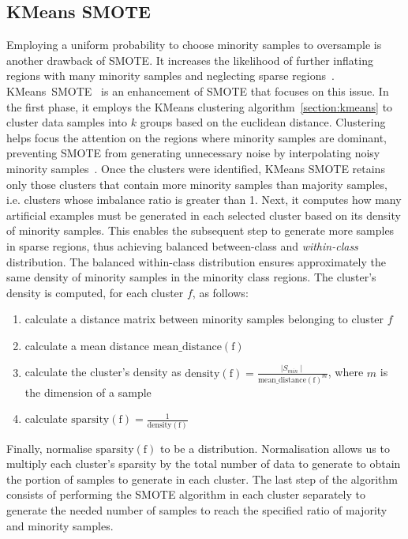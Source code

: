 \subsection{KMeans SMOTE}
\label{subsection:kmeans-smote}

Employing a uniform probability to choose minority samples to oversample is another drawback of
SMOTE. It increases the likelihood of further inflating regions with many minority samples and
neglecting sparse regions~\cite{kmeans-smote}. KMeans~SMOTE~\cite{kmeans-smote} is an enhancement
of SMOTE that focuses on this issue. In the first phase, it employs the KMeans clustering
algorithm~\ref{section:kmeans} to cluster data samples into $k$ groups based on the euclidean
distance. Clustering helps focus the attention on the regions where minority samples are dominant,
preventing SMOTE from generating unnecessary noise by interpolating noisy minority
samples~\cite{kmeans-smote}. Once the clusters were identified, KMeans SMOTE retains only those
clusters that contain more minority samples than majority samples, i.e. clusters whose imbalance
ratio is greater than 1. Next, it computes how many artificial examples must be generated in each
selected cluster based on its density of minority samples. This enables the subsequent step to
generate more samples in sparse regions, thus achieving balanced between-class and
\emph{within-class} distribution. The balanced within-class distribution ensures approximately the
same density of minority samples in the minority class regions. The cluster's density is computed,
for each cluster $f$, as follows:

\begin{enumerate}
    \item calculate a distance matrix between minority samples belonging to cluster $f$
    \item calculate a mean distance $\mathrm{mean\_distance(f)}$
    \item calculate the cluster's density as $\mathrm{density(f)} = \frac{\mid S_{min}
        \mid}{\mathrm{mean\_distance(f)}^m}$, where $m$ is the dimension of a sample
    \item calculate $\mathrm{sparsity(f)} = \frac{1}{\mathrm{density(f)}}$
\end{enumerate}

Finally, normalise $\mathrm{sparsity(f)}$ to be a distribution. Normalisation allows us to multiply
each cluster's sparsity by the total number of data to generate to obtain the portion of samples to
generate in each cluster. The last step of the algorithm consists of performing the SMOTE algorithm
in each cluster separately to generate the needed number of samples to reach the specified ratio of
majority and minority samples.

